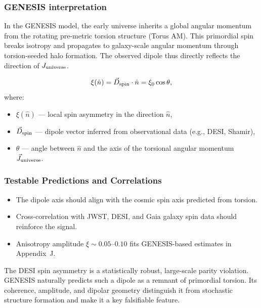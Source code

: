 \documentclass{article}
\begin{document}
\subsubsection*{GENESIS interpretation}
In the GENESIS model, the early universe inherits a global angular momentum from the rotating pre-metric torsion structure (Torus AM). This primordial spin breaks isotropy and propagates to galaxy-scale angular momentum through torsion-seeded halo formation. The observed dipole thus directly reflects the direction of $J_{\rm universe}$.

\begin{equation}\label{eq:auto179}
\xi(\hat{n}) = \vec{D}_{\rm spin} \cdot \hat{n} = \xi_0 \cos \theta,
\end{equation}
\vspace{0.2cm}
\noindent
where:
\begin{itemize}
  \item $\xi(\hat{n})$ — local spin asymmetry in the direction $\hat{n}$,
  \item $\vec{D}_{\rm spin}$ — dipole vector inferred from observational data (e.g., DESI, Shamir),
  \item $\theta$ — angle between $\hat{n}$ and the axis of the torsional angular momentum $\vec{J}_{\rm universe}$.
\end{itemize}


\subsubsection*{Testable Predictions and Correlations}
\begin{itemize}
  \item The dipole axis should align with the cosmic spin axis predicted from torsion.
  \item Cross-correlation with JWST, DESI, and Gaia galaxy spin data should reinforce the signal.
  \item Anisotropy amplitude $\xi \sim 0.05$--$0.10$ fits GENESIS-based estimates in Appendix~J.
\end{itemize}



\begin{tcolorbox}[colback=gray!5, colframe=black!30, title=Why this matters]
The DESI spin asymmetry is a statistically robust, large-scale parity violation. GENESIS naturally predicts such a dipole as a remnant of primordial torsion. Its coherence, amplitude, and dipolar geometry distinguish it from stochastic structure formation and make it a key falsifiable feature.
\end{tcolorbox}
\end{document}
